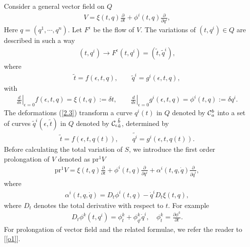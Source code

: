 \documentclass[a4paper,a4paper]{article}
\begin{document}
Consider a general  vector field on $Q$
\begin{align}
 V=\xi(t,q)\frac{\partial}{\partial t}
    +\phi^i(t,q)\frac{\partial}{\partial q^i},  \label{2.1}
\end{align}
Here $q=(q^{1},\cdots, q^{n}).$  Let 
 $F^{\epsilon}$ be the flow of $V$. The
variations of $(t,q^i)\in Q$ are described in such a way
\begin{align}
(t, q^i) \rightarrow F^{\epsilon}(t, q^i)=(\tilde{t}, \tilde{q}^i),
\label{2.2}
\end{align}
where
\begin{align}
  \tilde{t}=f(\epsilon, t, q),\qquad %
  \tilde{q}^i=g^i(\epsilon, t, q),  \label{2.3}
\end{align}
with
\begin{align}
   \left.\frac{d}{d\epsilon}\right|_{\epsilon=0}f(\epsilon, t, q)=\xi(t,q):=\delta t,
   \quad \quad \left.\frac{d}{d\epsilon}\right|_{\epsilon=0}g^i(\epsilon, t, q)
   =\phi^i(t,q):=\delta q^i.
   \label{2.4}
\end{align}
 The deformations (\ref{2.3}) transform a curve
$q^i(t)$ in $Q$ denoted by ${{\cal C}}_a^b$ into a
set of curves $\tilde{q}^i(\epsilon, \tilde{t})$ in $Q$ denoted by ${{\cal
C}_\epsilon}_{\tilde a}^{\tilde b}$,
determined by
\begin{align}
\tilde{t}=f(\epsilon, t, q(t)),\qquad %
  \tilde{q^i}=g^i(\epsilon, t, q(t)).  \label{2.5}
\end{align}
Before calculating the total variation of $S$, we introduce  the
first order prolongation of $V$ denoted as $\text{pr}^{1}V$
\begin{align}
 \text{pr}^{1}V=\xi(t,q)\frac{\partial}{\partial t}+
                \phi^i(t,q)\frac{\partial}{\partial q^i}
      +\alpha^i(t, q, \dot{q})\frac{\partial}{\partial \dot{q}^i},  \label{2.8}
\end{align}
where %
\begin{align}
 \alpha^i(t, q, \dot{q})=D_{t}\phi^i(t, q)-\dot{q}^iD_{t}\xi(t,q), \label{2.9}
\end{align}
where $D_{t}$ denotes the total derivative with respect to $t$. For example
\begin{align*}
  D_{t}\phi^k(t, q^i)=\phi_{t}^k+\phi_{q^i}^k\dot{q}^i, \quad
  \phi_{t}^k=\frac{\partial \phi^k}{\partial t}.
\end{align*}
For prolongation of vector field and the related formulae, we
refer
the reader to %
[\ref{o1}].%
\end{document}
